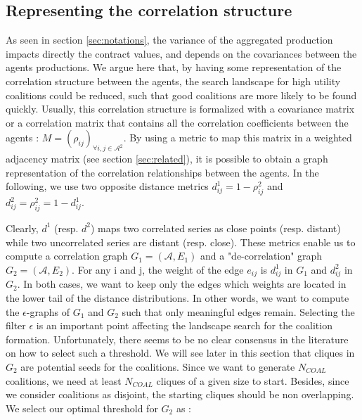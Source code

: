 \documentclass[journal]{IEEEtran}
\begin{document}
\subsection{Representing the correlation structure}
As seen in section \ref{sec:notations}, the variance of the aggregated production impacts directly the contract values, and depends on the covariances between the agents productions. We argue here that, by having some representation of the correlation structure between the agents, the search landscape for high utility coalitions could be reduced, such that good coalitions are more likely to be found quickly. Usually, this correlation structure is formalized with a covariance matrix or a correlation matrix that contains all the correlation coefficients between the agents : $ M = (\rho_{ij})_{\forall i,j \in \mathcal{A}^{2}}$. By using a metric to map this matrix in a weighted adjacency matrix (see section \ref{sec:related}), it is possible to obtain a graph representation of the correlation relationships between the agents. In the following, we use two opposite distance metrics $  d_{ij}^{1} = 1 - \rho_{ij}^{2} $ and $ d_{ij}^{2} = \rho_{ij}^{2} = 1 - d_{ij}^{1} $.


Clearly, $ d^{1} $ (resp. $ d^{2} $) maps two correlated series as close points (resp. distant) while two uncorrelated series are distant (resp. close). These metrics enable us to compute a correlation graph $ G_{1} = (\mathcal{A}, E_{1}) $ and a "de-correlation" graph $ G_{2} = (\mathcal{A}, E_{2} ) $. For any i and j, the weight of the edge $ e_{ij} $ is $ d_{ij}^{1} $ in $ G_{1} $ and $ d_{ij}^{2} $ in $ G_{2} $. In both cases, we want to keep only the edges which weights are located in the lower tail of the distance distributions. In other words, we want to compute the $ \epsilon$-graphs of $ G_{1} $ and $ G_{2} $ such that only meaningful edges remain. Selecting the filter $ \epsilon $ is an important point affecting the landscape search for the coalition formation. Unfortunately, there seems to be no clear consensus in the literature on how to select such a threshold. We will see later in this section that cliques in $ G_{2} $ are potential seeds for the coalitions. Since we want to generate $ N_{COAL} $ coalitions, we need at least $ N_{COAL} $ cliques of a given size to start. Besides, since we consider coalitions as disjoint, the starting cliques should be non overlapping. We select our optimal threshold for $ G_{2} $ as :
\end{document}
